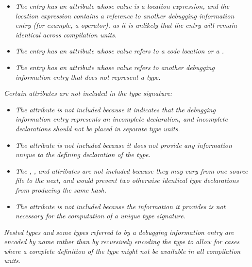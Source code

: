 \begin{itemize}

\item \textit{The entry has an attribute whose value is a location
expression, and the location expression contains a reference to
another debugging information entry (for example, a \DWOPcallref{}
operator), as it is unlikely that the entry will remain
identical across compilation units.}

\item \textit{The entry has an attribute whose value refers
to a code location or a .}

\item \textit{The entry has an attribute whose value refers
to another debugging information entry that does not represent
a type.}
\end{itemize}


\textit{Certain attributes are not included in the type signature:}

\begin{itemize}
\item \textit{The \DWATdeclaration{} attribute is not included because it
indicates that the debugging information entry represents an
incomplete declaration, and incomplete declarations should
not be placed in 
separate type units.}

\item \textit{The \DWATdescription{} attribute is not included because
it does not provide any information unique to the defining
declaration of the type.}

\item \textit{The \DWATdeclfile, 
\DWATdeclline, and
\DWATdeclcolumn{} attributes are not included because they
may vary from one source file to the next, and would prevent
two otherwise identical type declarations from producing the
same \MDfive{} hash.}

\item \textit{The \DWATobjectpointer{} attribute is not included 
because the information it provides is not necessary for the 
computation of a unique type signature.}

\end{itemize}

\textit{Nested types and some types referred to by a debugging 
information entry are encoded by name rather than by recursively 
encoding the type to allow for cases where a complete definition 
of the type might not be available in all compilation units.}

